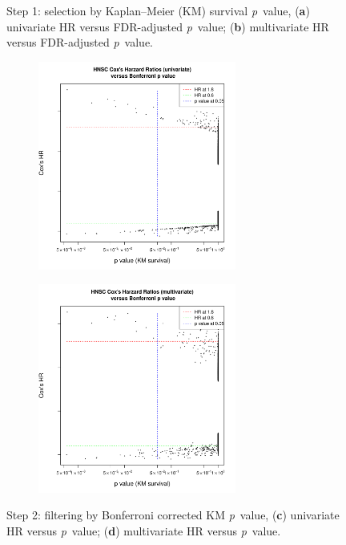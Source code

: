 \documentclass[
paper=landscape,
paper=160mm:90mm, %
fontsize=11pt, %
pagesize, %
parskip=half-, %
]{scrartcl} %
\theoremstyle{mythmstyle} %
\begin{document}
\begin{figure}[ht]
\caption{
Step 1: selection by Kaplan--Meier (KM) survival \textit{p}~value, 
(\textbf{a}) univariate HR versus FDR-adjusted \textit{p}~value; (\textbf{b}) multivariate HR versus FDR-adjusted \textit{p}~value.}

\end{figure}

\clearpage
\begin{figure}
    \begin{subfigure}[b]{0.45\textwidth}
        \includegraphics[width=6.5cm]{Rplot02_BonferroniP_uniHR.pdf}
    \end{subfigure} \hfill
    \begin{subfigure}[b]{0.45\textwidth}
        \includegraphics[width=6.5cm]{Rplot02_BonferroniP_multiHR.pdf}
    \end{subfigure}

\caption{
Step 2: filtering by Bonferroni corrected KM \textit{p}~value, 
(\textbf{c}) univariate HR versus \textit{p}~value; (\textbf{d}) multivariate HR versus \textit{p}~value.}

\end{figure}%
\end{document}

